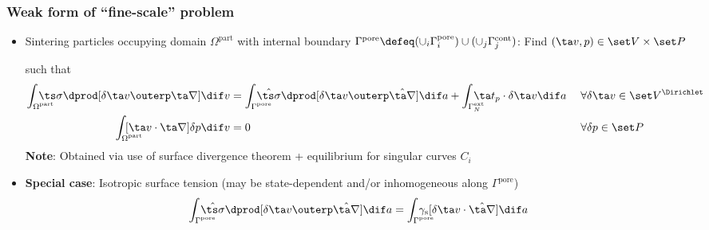 \documentclass[11pt]{beamer} %
\newcommand{\pore}{\mathrm{pore}}
\newcommand{\particle}{\mathrm{part}}
\newcommand{\surf}{\mathrm{s}}
\newcommand{\contact}{\mathrm{cont}}
\newcommand{\external}{\mathrm{ext}}
\renewcommand{\alert}[1]{\textbf{#1}}
\begin{document}
\begin{frame}
 \frametitle{Weak form of ``fine-scale'' problem}
 \begin{itemize}
  \item Sintering particles occupying domain $\Omega^\particle$ with internal boundary $\Gamma^\pore \defeq (\cup_i \Gamma_i^\pore) \cup (\cup_j \Gamma_j^\contact)$:
Find $(\ta v,p)\in \set V \times \set P$

 such that
\begin{align*}
  \int_{\mathrlap{\Omega^\particle}} \;\ts\sigma\dprod[\delta\ta v\outerp\ta\nabla]\dif v &=
   \int_{\mathrlap{\Gamma^\pore}} \;\hat{\ts\sigma}\dprod[\delta\ta v\outerp\hat{\ta\nabla}] \dif a +
   \int_{\mathrlap{\Gamma_N^\external}} \;\ta t_p\cdot\delta\ta v\dif a \; && \forall \delta \ta v\in \set V^\Dirichlet\\
  \int_{\mathrlap{\Omega^\particle}} \;[\ta v\cdot\ta\nabla]\delta p\dif v &= 0 && \forall \delta p\in \set P
\end{align*}
\alert{Note}: Obtained via use of surface divergence theorem + equilibrium for singular curves $C_i$

 \item \alert{Special case}: Isotropic surface tension (may be state-dependent and/or inhomogeneous along $\Gamma^\pore$)
 \begin{align*}
  \int_{\mathrlap{\Gamma^\pore}} \;\hat{\ts\sigma}\dprod[\delta\ta v\outerp\hat{\ta\nabla}] \dif a =
  \int_{\mathrlap{\Gamma^\pore}} \;\gamma_\surf[\delta\ta v\cdot\hat{\ta\nabla}] \dif a
 \end{align*}

 \end{itemize}

\end{frame}
\end{document}
